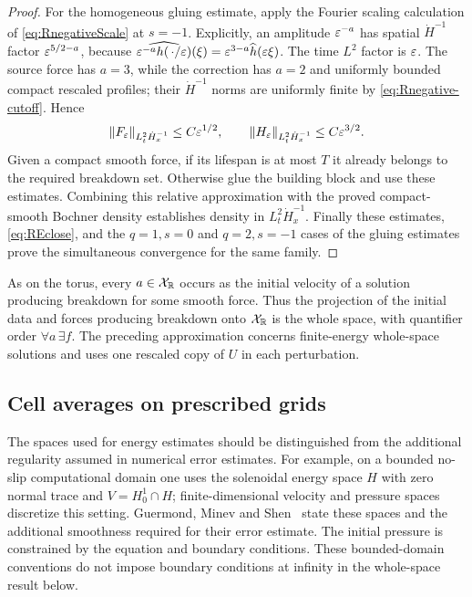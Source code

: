 \begin{proof}
For the homogeneous gluing estimate, apply the Fourier scaling calculation of \eqref{eq:RnegativeScale} at $s=-1$. Explicitly, an amplitude $\varepsilon^{-a}$ has spatial $\dot H^{-1}$ factor $\varepsilon^{5/2-a}$, because
$\widehat{\varepsilon^{-a}h(\,\cdot/\varepsilon)}(\xi)=\varepsilon^{3-a}\widehat h(\varepsilon\xi)$.
The time $L^2$ factor is $\varepsilon$. The source force has $a=3$, while the correction has $a=2$ and uniformly bounded compact rescaled profiles; their $\dot H^{-1}$ norms are uniformly finite by \eqref{eq:Rnegative-cutoff}. Hence
\[
 \left\lVert F_\varepsilon\right\rVert_{L^2_t\dot H^{-1}_x}\le C\varepsilon^{1/2},\qquad
 \left\lVert H_\varepsilon\right\rVert_{L^2_t\dot H^{-1}_x}\le C\varepsilon^{3/2}.
\]
Given a compact smooth force, if its lifespan is at most $T$ it already belongs to the required breakdown set. Otherwise glue the building block and use these estimates. Combining this relative approximation with the proved compact-smooth Bochner density establishes density in $L^2_t\dot H^{-1}_x$. Finally these estimates, \eqref{eq:REclose}, and the $q=1,s=0$ and $q=2,s=-1$ cases of the gluing estimates prove the simultaneous convergence for the same family.
\end{proof}

As on the torus, every $a\in\mathcal X_{\mathbb R}$ occurs as the initial velocity of a solution producing breakdown for some smooth force. Thus the projection of the initial data and forces producing breakdown onto $\mathcal X_{\mathbb R}$ is the whole space, with quantifier order $\forall a\,\exists f$. The preceding approximation concerns finite-energy whole-space solutions and uses one rescaled copy of $U$ in each perturbation.

\subsection{Cell averages on prescribed grids}\label{sec:grids}
The spaces used for energy estimates should be distinguished from the
additional regularity assumed in numerical error estimates. For example,
on a bounded no-slip computational domain one uses the solenoidal energy
space $H$ with zero normal trace and $V=H^1_0\cap H$; finite-dimensional
velocity and pressure spaces discretize this setting. Guermond, Minev and
Shen~\cite[Section~2 and Theorem~3.2]{gms} state these spaces and the
additional smoothness required for their error estimate. The initial
pressure is constrained by the equation and boundary conditions. These
bounded-domain conventions do not impose boundary conditions at infinity
in the whole-space result below.

